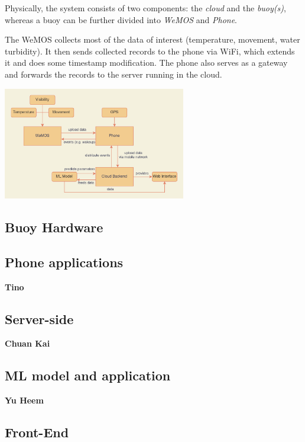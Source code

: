 \documentclass{article}
\begin{document}
\begin{multicols}{2}

Physically, the system consists of two components: the \textit{cloud} and the \textit{buoy(s)}, whereas a buoy can be further divided into \textit{WeMOS} and \textit{Phone}. 

The WeMOS collects most of the data of interest (temperature, movement, water turbidity). It then sends collected records to the phone via WiFi, which extends it and does some timestamp modification. The phone also serves as a gateway and forwards the records to the server running in the cloud.

\includegraphics[width=8cm]{report/resources/architecture.png}

\end{multicols}

\subsection{Buoy Hardware}

\subsection{Phone applications}

\textbf{Tino}

\subsection{Server-side}

\textbf{Chuan Kai}

\subsection{ML model and application}

\textbf{Yu Heem}

\subsection{Front-End}
\end{document}
